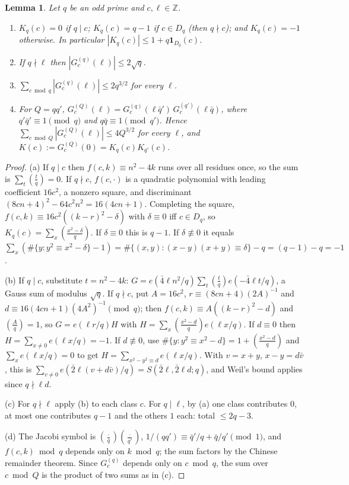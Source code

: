 \documentclass[11pt,reqno]{amsart}
\newtheorem{lemma}[theorem]{Lemma}
\theoremstyle{definition}
\newcommand{\Z}{\mathbb Z}
\newcommand{\leg}[2]{\left(\frac{#1}{#2}\right)}
\begin{document}
\begin{lemma}\label{lem:complete}
Let $q$ be an odd prime and $c,\ell\in\Z$.
\begin{enumerate}
\item[(a)] $K_q(c)=0$ if $q\mid c$; $K_q(c)=q-1$ if $c\in D_q$ (then
$q\nmid c$); and $K_q(c)=-1$ otherwise.  In particular
$|K_q(c)|\le 1+q\mathbf 1_{D_q}(c)$.
\item[(b)] If $q\nmid\ell$ then $|G_c^{(q)}(\ell)|\le 2\sqrt q$.
\item[(c)] $\sum_{c\bmod q}|G_c^{(q)}(\ell)|\le 2q^{3/2}$ for every $\ell$.
\item[(d)] For $Q=qq'$, $G_c^{(Q)}(\ell)=G_c^{(q)}(\ell\bar q')\,
G_c^{(q')}(\ell\bar q)$, where $q'\bar q'\equiv1\pmod q$ and
$q\bar q\equiv1\pmod{q'}$.  Hence
$\sum_{c\bmod Q}|G_c^{(Q)}(\ell)|\le4Q^{3/2}$ for every $\ell$, and
$K(c):=G^{(Q)}_c(0)=K_q(c)K_{q'}(c)$.
\end{enumerate}
\end{lemma}
\begin{proof}
(a) If $q\mid c$ then $f(c,k)\equiv n^2-4k$ runs over all residues once,
so the sum is $\sum_t\leg tq=0$.  If $q\nmid c$, $f(c,\cdot)$ is a
quadratic polynomial with leading coefficient $16c^2$, a nonzero
square, and discriminant $(8cn+4)^2-64c^2n^2=16(4cn+1)$.  Completing the
square, $f(c,k)\equiv16c^2((k-r)^2-\delta)$ with $\delta\equiv0$ iff
$c\in D_q$, so $K_q(c)=\sum_x\leg{x^2-\delta}q$.  If $\delta\equiv0$ this is
$q-1$.  If $\delta\not\equiv0$ it equals
$\sum_x(\#\{y:y^2\equiv x^2-\delta\}-1)=\#\{(x,y):(x-y)(x+y)\equiv\delta\}-q
=(q-1)-q=-1$.

(b) If $q\mid c$, substitute $t=n^2-4k$: $G=e(\bar4\ell n^2/q)\sum_t\leg
tq e(-\bar4\ell t/q)$, a Gauss sum of modulus $\sqrt q$.  If $q\nmid c$,
put $A=16c^2$, $r\equiv(8cn+4)(2A)^{-1}$ and $d\equiv16(4cn+1)(4A^2)^{-1}
\pmod q$; then $f(c,k)\equiv A((k-r)^2-d)$ and $\leg Aq=1$, so
$G=e(\ell r/q)H$ with $H=\sum_x\leg{x^2-d}{q}e(\ell x/q)$.  If $d\equiv0$
then $H=\sum_{x\ne0}e(\ell x/q)=-1$.  If $d\not\equiv0$, use
$\#\{y:y^2\equiv x^2-d\}=1+\leg{x^2-d}q$ and $\sum_xe(\ell x/q)=0$ to get
$H=\sum_{x^2-y^2\equiv d}e(\ell x/q)$.  With $v=x+y$, $x-y=d\bar v$, this is
$\sum_{v\ne0}e(\bar2\ell(v+d\bar v)/q)=S(\bar2\ell,\bar2\ell d;q)$, and
Weil's bound applies since $q\nmid\ell d$.

(c) For $q\nmid\ell$ apply (b) to each class $c$.  For $q\mid\ell$, by
(a) one class contributes $0$, at most one contributes $q-1$ and the
others $1$ each: total $\le2q-3$.

(d) The Jacobi symbol is $\leg\cdot q\leg\cdot{q'}$,
$1/(qq')\equiv\bar q'/q+\bar q/q'\pmod 1$, and $f(c,k)\bmod q$ depends only
on $k\bmod q$; the sum factors by the Chinese remainder theorem.  Since
$G^{(q)}_c$ depends only on $c\bmod q$, the sum over $c\bmod Q$ is the
product of two sums as in (c).
\end{proof}
\end{document}
